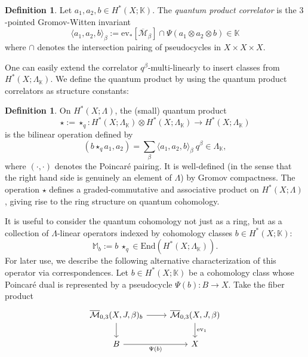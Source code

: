 \documentclass[reqno]{amsart}
\numberwithin{equation}{section}
\numberwithin{equation}{section}
\numberwithin{equation}{section}
\theoremstyle{definition}
\newtheorem{defn}[thm]{Definition}
\theoremstyle{remark}
\theoremstyle{remark}
\begin{document}
\begin{defn}
    Let $a_1, a_2, b \in H^*(X;\mathbb{K})$. The \emph{quantum product correlator} is the $3$-pointed Gromov-Witten invariant
    \begin{equation}
        \langle a_1, a_2, b \rangle_\beta := \mathrm{ev}_*[\overline{\mathcal{M}}_\beta] \cap \Psi(a_1 \otimes a_2 \otimes b) \in \mathbb{K}
    \end{equation}
    where $\cap$ denotes the intersection pairing of pseudocycles in $X \times X \times X$.
\end{defn}

One can easily extend the correlator $q^\beta$-multi-linearly to insert classes from $H^*(X;\Lambda_{\mathbb{K}})$. We define the quantum product by using the quantum product correlators as structure constants:

\begin{defn}
    On $H^*(X;\Lambda)$, the (small) quantum product $$\star := \star_q : H^*(X;\Lambda_{\mathbb{K}}) \otimes H^*(X;\Lambda_{\mathbb{K}})\to H^*(X;\Lambda_{\mathbb{K}})$$ is the bilinear operation defined by
    \begin{equation}
        \left( b \star_q a_1, a_2 \right) = \sum_{\beta} \langle a_1, a_2, b \rangle_\beta \  q^\beta \in \Lambda_{\mathbb{K}},
    \end{equation}
    where $(\cdot, \cdot)$ denotes the Poincar\'e pairing. It is well-defined (in the sense that the right hand side is genuinely an element of $\Lambda$) by Gromov compactness. The operation $\star$ defines a graded-commutative and associative product on $H^*(X;\Lambda)$ \cite[Chapter 9]{MS12}, giving rise to the ring structure on quantum cohomology.
\end{defn}

It is useful to consider the quantum cohomology not just as a ring, but as a collection of $\Lambda$-linear operators indexed by cohomology classes $b \in H^*(X;\mathbb{K})$:
\begin{equation}
    \mathbb{M}_b := b \  \star_q \in \mathrm{End}(H^*(X;\Lambda_{\mathbb{K}})).
\end{equation}
For later use, we describe the following alternative characterization of this operator via correspondences. Let $b \in H^*(X;\mathbb{K})$ be a cohomology class whose Poincar\'e dual is represented by a pseudocycle $\Psi(b): B \to X$. Take the fiber product 
    \begin{equation}
        \begin{tikzcd}
{\overline{\mathcal{M}}_{0,3}(X, J, \beta)_b} \arrow[d] \arrow[r]  & {\overline{\mathcal{M}}_{0,3}(X, J, \beta)} \arrow[d, "\mathrm{ev}_1"] \\
B \arrow[r, "\Psi(b)"']                                       & X            
\end{tikzcd}
    \end{equation}
\end{document}
